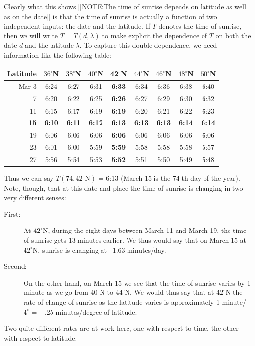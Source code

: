 Clearly what this shows 
[[NOTE:The time of sunrise depends on latitude as well as on the date]]
is that the time of sunrise is actually a function of two independent
inputs: the date and the latitude. If $T$ denotes the time of sunrise,
then we will write $T = T(d, \lambda)$ to make explicit the dependence
of $T$ on both the date $d$ and the latitude $\lambda$.  To capture
this double dependence, we need information like the following
table:\label{sunrise table}
\begin{center}


\begin{tabular}{rcccccccc}
Latitude&$36^\circ$N&$38^\circ$N&$40^\circ$N&

{\bf 42$^\circ$N}&
$44^\circ$N&$46^\circ$N&$48^\circ$N&$50^\circ$N \\ \hline
Mar 	3 &	6:24 &  6:27 &  6:31 &	{\bf 6:33} &	6:34 &	6:36 &	6:38 &	6:40 \\  
7 &	6:20 &	6:22 &	6:25 &	{\bf 6:26} &	6:27 &	6:29 &	6:30 &	6:32 \\  
11 &	6:15 &	6:17 &	6:19 &	{\bf 6:19} &	6:20 &	6:21 &	6:22 &	6:23 \\

{\bf 15} &	{\bf 6:10} &	{\bf 6:11} &	{\bf 6:12} &	

{\bf 6:13} &	{\bf 6:13} &	{\bf 6:13} &	{\bf 6:14} &	

{\bf 6:14} \\
19 &	6:06 &	6:06 &	6:06 &	{\bf 6:06} &	6:06 &	6:06 &	6:06 &	6:06 \\
23 &	6:01 &	6:00 &	5:59 &	{\bf 5:59} &	5:58 &	5:58 &	5:58 &	5:57 \\
27 &	5:56 &	5:54 &	5:53 &	{\bf 5:52} &	5:51 &	5:50 &	5:49 &	5:48 
\end{tabular}

\end{center}
Thus we can say $T(74, 42^\circ\mbox{N})$ = 6:13  (March 15 is the 74-th day of the year).  Note, though, that at this date and place the time of sunrise is changing in two very different senses:
\begin{description}
	\item[First:]  At $42^\circ$N, during the eight days between March 11 and March 19, the time of sunrise gets 13 minutes earlier. We thus would say that on March 15 at $42^\circ$N, sunrise is changing at --1.63 minutes/day.
	\item[Second:]  On the other hand, on March 15 we see that the time of sunrise varies by 1 minute as we go from $40^\circ$N to $44^\circ$N.  We would thus say that at $42^\circ$N the rate of change of sunrise as the latitude varies is approximately 1 minute/$4^\circ$ = +.25 minutes/degree of latitude.
\end{description}
Two quite different rates are at work here, one with respect to time, the other with respect to latitude.




